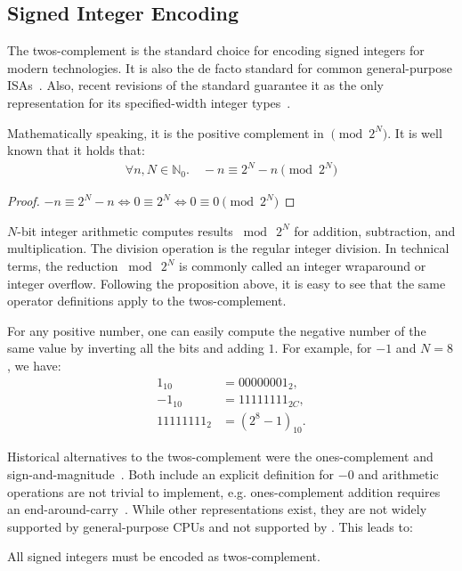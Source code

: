 \subsection{Signed Integer Encoding}

The \gls{twos-complement} is the standard choice for encoding signed integers for modern technologies. It is also the de facto standard for common general-purpose \glspl{ISA}~\cite{ia32,arm-isa}. Also, recent revisions of the  standard guarantee it as the only representation for its specified-width integer types~\cite{ISO:2018:III}.

Mathematically speaking, it is the positive complement in $\pmod 2^N$. It is well known that it holds that:
\begin{align*}
  \forall n,N \in \mathbb{N}_0. \quad -n \equiv 2^N - n \pmod{2^N}
\end{align*}
\begin{proof}
  $-n \equiv 2^N - n \Leftrightarrow 0 \equiv 2^N \Leftrightarrow 0 \equiv 0 \pmod{2^N}$
\end{proof}

$N$-bit integer arithmetic computes results $\bmod~2^N$ for addition, subtraction, and multiplication. The division operation is the regular integer division. In technical terms, the reduction $\bmod~2^N$ is commonly called an integer wraparound or integer overflow. Following the proposition above, it is easy to see that the same operator definitions apply to the \gls{twos-complement}.

For any positive number, one can easily compute the negative number of the same value by inverting all the bits and adding $1$. For example, for $-1$ and $N = 8$, we have:
\begin{align*}
   1_{10} &= 00000001_2,\\
  -1_{10} &= 11111111_{2C},\\
  11111111_{2} &= (2^8 - 1)_{10}.
\end{align*}

Historical alternatives to the \gls{twos-complement} were the \gls{ones-complement} and \gls{sign-and-magnitude}~\cite{ISO:2018:III}. Both include an explicit definition for $-0$ and arithmetic operations are not trivial to implement, e.g. \gls{ones-complement} addition requires an end-around-carry~\cite{1674817}. While other representations exist, they are not widely supported by general-purpose \glspl{CPU} and not supported by . This leads to:

\begin{requirement}
  All signed integers must be encoded as \gls{twos-complement}.
\end{requirement}

